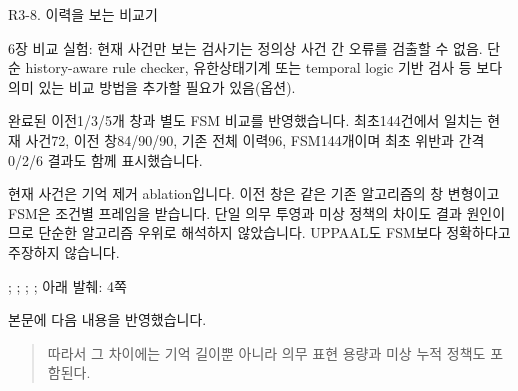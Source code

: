 \begin{reviewitem}{R3-8. 이력을 보는 비교기}

\begin{reviewercomment}

6장 비교 실험: 현재 사건만 보는 검사기는 정의상 사건 간 오류를 검출할 수 없음. 단순 history-aware rule checker, 유한상태기계 또는 temporal logic 기반 검사 등 보다 의미 있는 비교 방법을 추가할 필요가 있음(옵션).

\end{reviewercomment}

\begin{authorresponse}

완료된 이전1/3/5개 창과 별도 FSM 비교를 반영했습니다. 최초144건에서 일치는 현재 사건72, 이전 창84/90/90, 기존 전체 이력96, FSM144개이며 최초 위반과 간격0/2/6 결과도 함께 표시했습니다.

현재 사건은 기억 제거 ablation입니다. 이전 창은 같은 기존 알고리즘의 창 변형이고 FSM은 조건별 프레임을 받습니다. 단일 의무 투영과 미상 정책의 차이도 결과 원인이므로 단순한 알고리즘 우위로 해석하지 않았습니다. UPPAAL도 FSM보다 정확하다고 주장하지 않습니다.

\end{authorresponse}

\begin{manuscriptrevision}{; ; ; ; 아래 발췌: 4쪽}

본문에 다음 내용을 반영했습니다.

\begin{quote}

따라서 그 차이에는 기억 길이뿐 아니라 의무 표현 용량과 미상 누적 정책도 포함된다.

\end{quote}

\end{manuscriptrevision}

\end{reviewitem}

\clearpage

